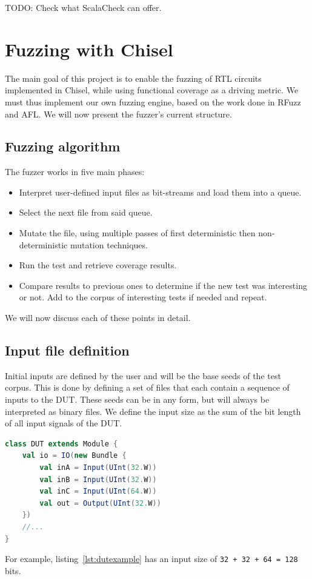 \documentclass[conference]{IEEEtran}
\newcommand{\todo}[1]{{\color{olive} TODO: #1}}
\begin{document}
\todo{Check what ScalaCheck can offer.}


\section{Fuzzing with Chisel}
The main goal of this project is to enable the fuzzing of RTL circuits implemented in Chisel, while using functional coverage as a driving metric.
We must thus implement our own fuzzing engine, based on the work done in RFuzz and AFL. 
We will now present the fuzzer's current structure.

\subsection{Fuzzing algorithm}  
The fuzzer works in five main phases:  
\begin{itemize}
\item Interpret user-defined input files as bit-streams and load them into a queue.
\item Select the next file from said queue.
\item Mutate the file, using multiple passes of first deterministic then non-deterministic mutation techniques.  
\item Run the test and retrieve coverage results. 
\item Compare results to previous ones to determine if the new test was interesting or not. Add to the corpus of interesting tests if needed and repeat. 
\end{itemize}  

We will now discuss each of these points in detail.  
\subsection{Input file definition} 
Initial inputs are defined by the user and will be the base seeds of the test corpus.
This is done by defining a set of files that each contain a sequence of inputs to the DUT.
These seeds can be in any form, but will always be interpreted as binary files.
We define the input size as the sum of the bit length of all input signals of the DUT.

\begin{lstlisting}[captionpos=b,caption={Basic DUT with two 32 bit inputs, one 64 input, as well as a 32 bit output.},label={lst:dutexample},language=scala]
class DUT extends Module {
    val io = IO(new Bundle {
        val inA = Input(UInt(32.W))
        val inB = Input(UInt(32.W))
        val inC = Input(UInt(64.W))
        val out = Output(UInt(32.W))
    })
    //...
}
\end{lstlisting}
For example, listing~\ref{lst:dutexample} has an input size of \texttt{32 + 32 + 64 = 128} bits.
\end{document}
